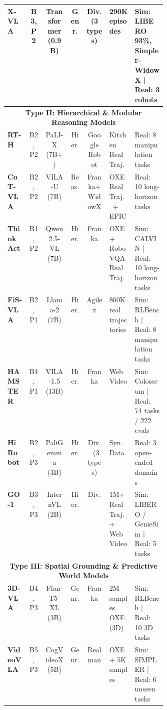 \documentclass[acmsmall,screen,review]{acmart}
\begin{document}
\begin{table}[t!]
\begin{tabular}{
  l
  c
  c
  c
  c
  p{0.168\linewidth}
  p{0.205\linewidth}
}
\textbf{X-VLA}~\cite{zheng2026xvla} & B3, P2 & Transformer (0.9B) & Genr. & Div. (3 types) & 290K episodes & Sim: LIBERO 93\%, Simpler-WidowX | Real: 3 robots \\

\midrule

\multicolumn{7}{c}{\textbf{Type II\@: Hierarchical \& Modular Reasoning Models}} \\
\midrule

\textbf{RT-H}~\cite{belkhale2024rth} & B2, P2 & PaLI-X (7B+) & Hier. & Google Robot & Kitchen Real Traj. & Real: 8 manipulation tasks \\

\textbf{CoT-VLA}~\cite{zhao2025cotvla} & B2, P2 & VILA-U (7B) & Reas. & Franka+WidowX & OXE Real Traj.\ + EPIC & Real: 10 long-horizon tasks \\

\textbf{ThinkAct}~\cite{huang2025thinkact} & B1, P2 & Qwen2.5-VL (7B) & Hier. & Franka & OXE + RoboVQA Real Traj. & Sim: CALVIN | Real: 10 long-horizon tasks \\

\textbf{FiS-VLA}~\cite{chen2025fis} & B2, P1 & Llama-2 (7B) & Hier. & Agilex & 860K real trajectories & Sim: RLBench | Real: 8 manipulation tasks \\

\textbf{HAMSTER}~\cite{li2025hamster} & B4, P1 & VILA-1.5 (13B) & Hier. & Franka & Web Video & Sim: Colosseum | Real: 74 tasks / 222 evals \\

\textbf{Hi Robot}~\cite{shi2025hirobot} & B2, P3 & PaliGemma (3B) & Hier. & Div.\ (3 types) & Syn. Data & Real: 3 open-ended domains \\

\textbf{GO-1}~\cite{agibot2025} & B3, P3 & InternVL (2B) & Hier. & Div. & 1M+ Real Traj. + Web Video & Sim: LIBERO / GenieSim | Real: 5 tasks \\

\midrule

\multicolumn{7}{c}{\textbf{Type III\@: Spatial Grounding \& Predictive World Models}} \\
\midrule

\textbf{3D-VLA}~\cite{zhen20243dvla} & B4, P3 & Flan-T5-XL (3B) & Genr. & Franka & 2M samples OXE (3D) & Sim: RLBench | Real: 10 3D tasks \\

\textbf{VideoVLA}~\cite{shen2025videovla} & B5, P3 & CogVideoX (5B) & Genr. & Realman & OXE + 5K samples & Sim: SIMPLER | Real: 6 unseen tasks \\


\end{tabular}
\end{table}
\end{document}
